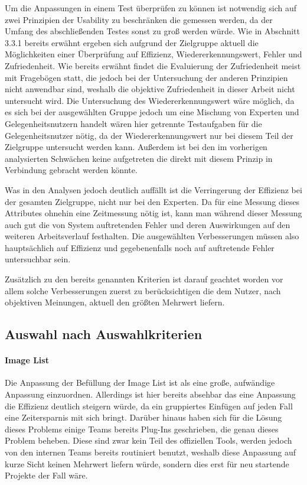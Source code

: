 Um die Anpassungen in einem Test überprüfen zu können ist notwendig sich auf zwei Prinzipien der Usability zu beschränken die gemessen werden, da der Umfang des abschließenden Testes sonst zu groß werden würde. Wie in Abschnitt 3.3.1 bereits erwähnt ergeben sich aufgrund der Zielgruppe aktuell die Möglichkeiten einer Überprüfung auf Effizienz, Wiedererkennungswert, Fehler und Zufriedenheit.
Wie bereits erwähnt findet die Evaluierung der Zufriedenheit meist mit Fragebögen statt, die jedoch bei der Untersuchung der anderen Prinzipien nicht anwendbar sind, weshalb die objektive Zufriedenheit in dieser Arbeit nicht untersucht wird.
Die Untersuchung des Wiedererkennungswert wäre möglich, da es sich bei der ausgewählten Gruppe jedoch um eine Mischung von Experten und Gelegenheitsnutzern handelt wären hier getrennte Testaufgaben für die Gelegenheitsnutzer nötig, da der Wiedererkennungswert nur bei diesem Teil der Zielgruppe untersucht werden kann.
Außerdem ist bei den im vorherigen analysierten Schwächen keine aufgetreten die direkt mit diesem Prinzip in Verbindung gebracht werden könnte.

Was in den Analysen jedoch deutlich auffällt ist die Verringerung der Effizienz bei der gesamten Zielgruppe, nicht nur bei den Experten.
Da für eine Messung dieses Attributes ohnehin eine Zeitmessung nötig ist, kann man während dieser Messung auch gut die von System auftretenden Fehler und deren Auswirkungen auf den weiteren Arbeitsverlauf festhalten.
Die ausgewählten Verbesserungen müssen also hauptsächlich auf Effizienz und gegebenenfalls noch auf auftretende Fehler untersuchbar sein.

Zusätzlich zu den bereits genannten Kriterien ist darauf geachtet worden vor allem solche Verbesserungen zuerst zu berücksichtigen die dem Nutzer, nach objektiven Meinungen, aktuell den größten Mehrwert liefern.

\subsection{Auswahl nach Auswahlkriterien}

\paragraph{Image List}
Die Anpassung der Befüllung der Image List ist als eine große, aufwändige Anpassung einzuordnen.
Allerdings ist hier bereits absehbar das eine Anpassung die Effizienz deutlich steigern würde, da ein gruppiertes Einfügen auf jeden Fall eine Zeitersparnis mit sich bringt.
Darüber hinaus haben sich für die Lösung dieses Problems einige Teams bereits Plug-Ins geschrieben, die genau dieses Problem beheben. 
Diese sind zwar kein Teil des offiziellen Tools, werden jedoch von den internen Teams bereits routiniert benutzt, weshalb diese Anpassung auf kurze Sicht keinen Mehrwert liefern würde, sondern dies erst für neu startende Projekte der Fall wäre.

